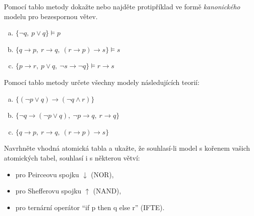 \begin{problem}
    
    Pomocí tablo metody dokažte nebo najděte protipříklad ve formě \emph{kanonického} modelu pro bezespornou větev.
    \begin{enumerate}[(a)]
        \item $\{ \neg q,\ p \vee q\} \models p$
        \item $\{ q \to p,\ r \to q,\ (r \to p) \to s\} \models s$
        \item $\{ p \to r,\ p \vee q,\ \neg s \to \neg q\} \models r \to s$
    \end{enumerate}

\end{problem}


\begin{problem}

    Pomocí tablo metody určete všechny modely následujících teorií:
    \begin{enumerate}[(a)]
        \item $\{(\neg p \vee q) \to (\neg q \wedge r)\}$
        \item $\{\neg q \to (\neg p \vee q),\ \neg p \to q,\ r \to q\}$
        \item $\{ q \to p,\ r \to q,\ (r \to p) \to s\}$
    \end{enumerate}

\end{problem}


\begin{problem} 
    Navrhněte vhodná atomická tabla a ukažte, že souhlasí-li model s kořenem vašich atomických tabel, souhlasí i s některou větví:
    \begin{itemize}
        \item pro Peirceovu spojku $\downarrow$ (NOR),
        \item pro Shefferovu spojku $\uparrow$ (NAND),
        \item pro ternární operátor ``if p then q else r'' (IFTE).
    \end{itemize}  
    
\end{problem}


